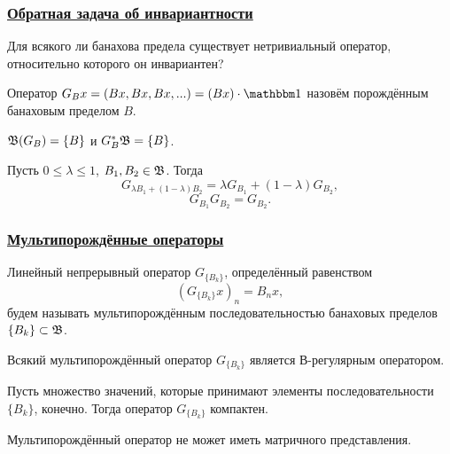\begin{frame}\frametitle{\underline{Обратная задача об инвариантности}}
	Для всякого ли банахова предела существует нетривиальный оператор, относительно которого он инвариантен?
	\vfill
	\begin{ddefinition}
		Оператор $G_B x = (Bx, Bx, Bx, ...) = (Bx)\cdot\one$
		назовём порождённым банаховым пределом $B$.
	\end{ddefinition}
	\vfill
	\begin{ttheorem}
		$\mathfrak{B}(G_B) = \{B\}$ и $G_B^* \mathfrak{B} = \{B\}$.
	\end{ttheorem}
	\vfill
	\begin{llemma}
		Пусть $0 \leq \lambda \leq 1$, $B_1, B_2 \in \mathfrak{B}$.
		Тогда
		\begin{equation}
			G_{\lambda B_1+(1-\lambda) B_2} =\lambda G_{B_1} + (1-\lambda)G_{B_2}
			,
		\end{equation}
		\begin{equation}
			G_{B_1} G_{B_2} = G_{B_2}
			.
		\end{equation}
	\end{llemma}
\end{frame}


\begin{frame}\frametitle{\underline{Мультипорождённые операторы}}
	\begin{ddefinition}
		Линейный непрерывный оператор $G_{\{B_k\}}$, определённый равенством
		\begin{equation}
			(G_{\{B_k\}}x)_n = B_n x
			,
		\end{equation}
		будем называть мультипорождённым последовательностью банаховых пределов $\{B_k\}\subset \mathfrak{B}$.
	\end{ddefinition}
	\vfill

	\begin{llemma}
		Всякий мультипорождённый оператор $G_{\{B_k\}}$ является В-регулярным оператором.
	\end{llemma}
	\vfill

	\begin{llemma}
		Пусть множество значений, которые принимают элементы последовательности ${\{B_k\}}$, конечно.
		Тогда оператор $G_{\{B_k\}}$ компактен.
	\end{llemma}
	\vfill

	\begin{ttheorem}
		Мультипорождённый оператор не может иметь матричного представления.
	\end{ttheorem}

\end{frame}


